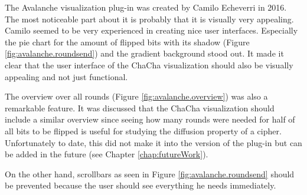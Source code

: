 The Avalanche visualization plug-in was created by Camilo Echeverri in 2016. The most noticeable part about it is probably that it is visually very appealing. Camilo seemed to be very experienced in creating nice user interfaces. Especially the pie chart for the amount of flipped bits with its shadow (Figure \ref{fig:avalanche.roundsend}) and the gradient background stood out. It made it clear that the user interface of the ChaCha visualization should also be visually appealing and not just functional.

The overview over all rounds (Figure \ref{fig:avalanche.overview}) was also a remarkable feature. It was discussed that the ChaCha visualization should include a similar overview since seeing how many rounds were needed for half of all bits to be flipped is useful for studying the diffusion property of a cipher. Unfortunately to date, this did not make it into the version of the plug-in but can be added in the future (see Chapter \ref{chap:futureWork}).

On the other hand, scrollbars as seen in Figure \ref{fig:avalanche.roundsend} should be prevented because the user should see everything he needs immediately.

